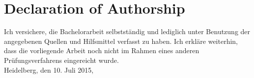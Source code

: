 \chapter*{Declaration of Authorship}

Ich versichere, die Bachelorarbeit selbstständig und lediglich unter Benutzung der angegebenen Quellen und Hilfsmittel verfasst zu haben. Ich erkläre weiterhin, dass die vorliegende Arbeit noch nicht im Rahmen eines anderen Prüfungsverfahrens eingereicht wurde.\\

Heidelberg, den 10. Juli 2015,

